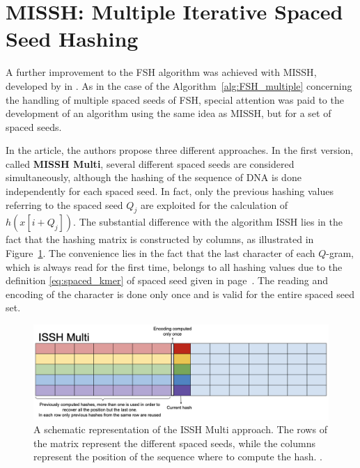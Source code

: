 \section{MISSH: Multiple Iterative Spaced Seed Hashing}
\label{sec:MISSH}

A further improvement to the \acs{FSH} algorithm was achieved with \acs{MISSH}, developed by \citeauthor*{mian2023missh} in  \cite{mian2023missh}. As in the case of the Algorithm~\ref{alg:FSH_multiple} concerning the handling of multiple spaced seeds of \acs{FSH}, special attention was paid to the development of an algorithm using the same idea as \acs{MISSH}, but for a set of spaced seeds.

In the article, the authors propose three different approaches. In the first version, called \textbf{MISSH Multi}, several different spaced seeds are considered simultaneously, although the hashing of the sequence of \acs{DNA} is done independently for each spaced seed. In fact, only the previous hashing values referring to the spaced seed $Q_j$ are exploited for the calculation of $h(x[i + Q_j])$. The substantial difference with the algorithm \acs{ISSH} lies in the fact that the hashing matrix is constructed by columns, as illustrated in Figure~\ref{fig:issh_multi}. The convenience lies in the fact that the last character of each $Q$-gram, which is always read for the first time, belongs to all hashing values due to the definition \ref{eq:spaced_kmer} of spaced seed given in page~\pageref{eq:spaced_kmer}. The reading and encoding of the character is done only once and is valid for the entire spaced seed set.

\begin{figure}[!ht]
	\centering
	\includegraphics[width=0.85\linewidth]{images/issh_multi}
	\caption[A schematic representation of the ISSH Multi approach]{A schematic representation of the ISSH Multi approach. The rows of the matrix represent the different spaced seeds, while the columns represent the position of the sequence where to compute the hash. \cite{mian2023missh}.}
	\label{fig:issh_multi}
\end{figure}

